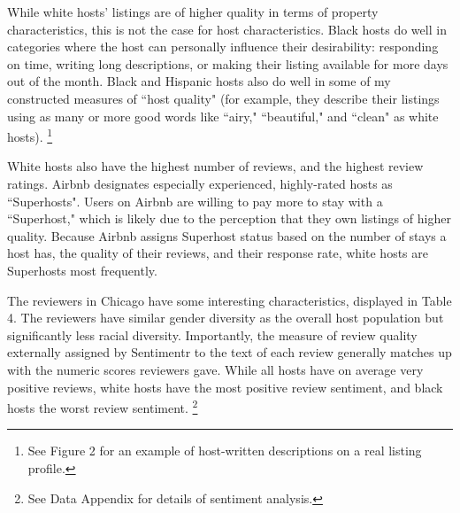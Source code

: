 While white hosts' listings are of higher quality in terms of property characteristics, this is not the case for host characteristics. Black hosts do well in categories where the host can personally influence their desirability: responding on time, writing long descriptions, or making their listing available for more days out of the month. %
Black and Hispanic hosts also do well in some of my constructed measures of ``host quality" (for example, they describe their listings using as many or more good words like ``airy," ``beautiful," and ``clean" as white hosts).%
	\footnote{See Figure 2 for an example of host-written descriptions on a real listing profile.} 
	

White hosts also have the highest number of reviews, and the highest review ratings. Airbnb designates especially experienced, highly-rated hosts as ``Superhosts". Users on Airbnb are willing to pay more to stay with a ``Superhost," which is likely due to the perception that they own listings of higher quality. Because Airbnb assigns Superhost status based on the number of stays a host has, the quality of their reviews, and their response rate, white hosts are Superhosts most frequently. %

The reviewers in Chicago have some interesting characteristics, displayed in Table 4. The reviewers have similar gender diversity as the overall host population but significantly less racial diversity. Importantly, the measure of review quality externally assigned by Sentimentr to the text of each review generally matches up with the numeric scores reviewers gave. While all hosts have on average very positive reviews, white hosts have the most positive review sentiment, and black hosts the worst review sentiment.%
	\footnote{See Data Appendix for details of sentiment analysis. } 
